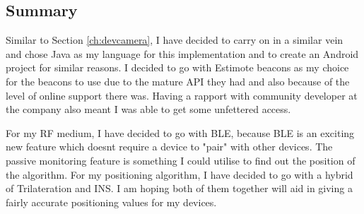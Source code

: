\subsection{Summary}
Similar to Section \ref{ch:devcamera}, I have decided to carry on in a similar vein and chose Java as my language for this implementation and to create an Android project for similar reasons. I decided to go with Estimote beacons as my choice for the beacons to use due to the mature API they had and also because of the level of online support there was. Having a rapport with community developer at the company also meant I was able to get some unfettered access. 

For my RF medium, I have decided to go with BLE, because BLE is an exciting new feature which doesnt require a device to "pair" with other devices. The passive monitoring feature is something I could utilise to find out the position of the algorithm. For my positioning algorithm, I have decided to go with a hybrid of Trilateration and INS. I am hoping both of them together will aid in giving a fairly accurate positioning values for my devices.